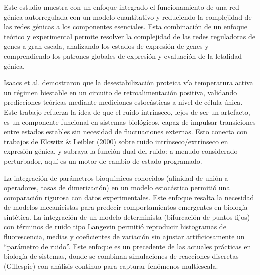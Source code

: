 \documentclass[nochap]{config/ejercicios}
\begin{document}
Este estudio muestra con un enfoque integrado el funcionamiento de una red génica autorregulada con un modelo cuantitativo y reduciendo la complejidad de las redes génicas a los componentes esenciales. Esta combinación de un enfoque teórico y experimental permite resolver la complejidad de las redes reguladoras de genes a gran escala, analizando los estados de expresión de genes y comprendiendo los patrones globales de expresión y evaluación de la letalidad génica.

Isaacs et al. demostraron que la desestabilización proteica vía temperatura activa un régimen biestable en un circuito de retroalimentación positiva, validando predicciones teóricas mediante mediciones estocásticas a nivel de célula única. Este trabajo refuerza la idea de que el ruido intrínseco, lejos de ser un artefacto, es un componente funcional en sistemas biológicos, capaz de impulsar transiciones entre estados estables sin necesidad de fluctuaciones externas. Esto conecta con trabajos de Elowitz \& Leibler (2000) sobre ruido intrínseco/extrínseco en expresión génica, y subraya la función dual del ruido: a menudo considerado perturbador, aquí es un motor de cambio de estado programado.



La integración de parámetros bioquímicos conocidos (afinidad de unión a operadores, tasas de dimerización) en un modelo estocástico permitió una comparación rigurosa con datos experimentales. Este enfoque resalta la necesidad de modelos mecanicistas para predecir comportamientos emergentes en biología sintética.
La integración de un modelo determinista (bifurcación de puntos fijos) con términos de ruido tipo Langevin permitió reproducir histogramas de fluorescencia, medias y coeficientes de variación sin ajustar artificiosamente un “parámetro de ruido”. Este enfoque es un precedente de las actuales prácticas en biología de sistemas, donde se combinan simulaciones de reacciones discretas (Gillespie) con análisis continuo para capturar fenómenos multiescala.
\end{document}
